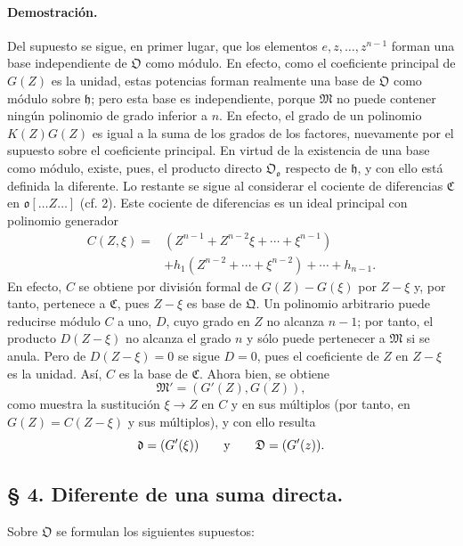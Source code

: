 \paragraph{Demostración.}
Del supuesto se sigue, en primer lugar, que los elementos $e,z,\ldots,z^{n-1}$ forman una base independiente de $\mathfrak O$ como módulo. En efecto, como el coeficiente principal de $G(Z)$ es la unidad, estas potencias forman realmente una base de $\mathfrak O$ como módulo sobre $\mathfrak h$; pero esta base es independiente, porque $\mathfrak M$ no puede contener ningún polinomio de grado inferior a $n$. En efecto, el grado de un polinomio $K(Z)G(Z)$ es igual a la suma de los grados de los factores, nuevamente por el supuesto sobre el coeficiente principal. En virtud de la existencia de una base como módulo, existe, pues, el producto directo $\mathfrak O_{\mathfrak o}$ respecto de $\mathfrak h$, y con ello está definida la diferente. Lo restante se sigue al considerar el cociente de diferencias $\mathfrak C$ en $\mathfrak o[\ldots Z\ldots]$ (cf. 2). Este cociente de diferencias es un ideal principal con polinomio generador
\[
\begin{aligned}
C(Z,\xi)={}&(Z^{n-1}+Z^{n-2}\xi+\cdots+\xi^{n-1})\\
&+h_1(Z^{n-2}+\cdots+\xi^{n-2})+\cdots+h_{n-1}.
\end{aligned}
\]
En efecto, $C$ se obtiene por división formal de $G(Z)-G(\xi)$ por $Z-\xi$ y, por tanto, pertenece a $\mathfrak C$, pues $Z-\xi$ es base de $\mathfrak Q$. Un polinomio arbitrario puede reducirse módulo $C$ a uno, $D$, cuyo grado en $Z$ no alcanza $n-1$; por tanto, el producto $D(Z-\xi)$ no alcanza el grado $n$ y sólo puede pertenecer a $\mathfrak M$ si se anula. Pero de $D(Z-\xi)=0$ se sigue $D=0$, pues el coeficiente de $Z$ en $Z-\xi$ es la unidad. Así, $C$ es la base de $\mathfrak C$. Ahora bien, se obtiene
\[
\mathfrak M'=(G'(Z),G(Z)),
\]
como muestra la sustitución $\xi\to Z$ en $C$ y en sus múltiplos (por tanto, en $G(Z)=C(Z-\xi)$ y sus múltiplos), y con ello resulta
\[
\mathfrak d=(G'(\xi))
\qquad\hbox{y}\qquad
\mathfrak D=(G'(z)).
\]
\subsection*{\S{} 4. Diferente de una suma directa.}

Sobre $\mathfrak O$ se formulan los siguientes supuestos:

